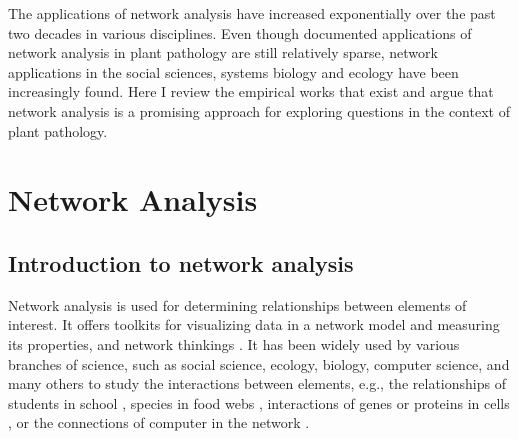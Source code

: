 
The applications of network analysis have increased exponentially over the past two decades in various disciplines. Even though documented applications of network analysis in plant pathology are still relatively sparse, network applications in the social sciences, systems biology and ecology have been increasingly found. Here I review the empirical works that exist and argue that network analysis is a promising approach for exploring questions in the context of plant pathology.





\section*{Network Analysis}
\subsection*{Introduction to network analysis}
Network analysis is used for determining relationships between elements of interest. It offers toolkits for visualizing data in a network model and measuring its properties, and network thinkings \citep{PROULX:2005hx}. It has been widely used by various branches of science, such as social science, ecology, biology, computer science, and many others to study the interactions between elements, e.g., the relationships of students in school \citep{moody2001race}, species in food webs \citep{krause2003compartments}, interactions of genes or proteins in cells \citep{guimera2005functional}, or the connections of computer in the network \citep{pastor2001epidemic, newman2006modularity}.

